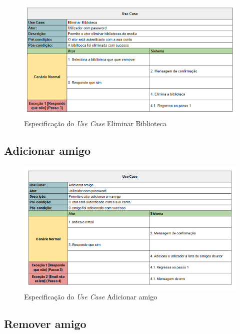 \documentclass[a4paper]{report}
\begin{document}
\begin{figure}[H]
	\centering 
    \includegraphics[width=\textwidth]{images/Eliminar_Biblioteca.png}  
    \caption{Especificação do \emph{Use Case} Eliminar Biblioteca}
\end{figure}

\subsection{Adicionar amigo}

\begin{figure}[H]
	\centering 
    \includegraphics[width=\textwidth]{images/Adicionar_Amigo.png}  
    \caption{Especificação do \emph{Use Case} Adicionar amigo}
\end{figure}

\subsection{Remover amigo}
\end{document}

